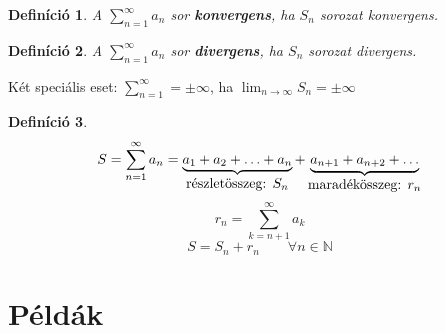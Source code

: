 \documentclass[a4paper,12pt,twoside]{book}
\newtheorem{defi}{Definíció}[chapter]
\theoremstyle{break}
\theoremstyle{plain}
\begin{document}
\begin{defi} A $\displaystyle \sum^{\infty}_{n=1} a_n$ sor \textbf{konvergens}, ha $S_n$ sorozat konvergens. \end{defi}

\begin{defi} A $\displaystyle \sum^{\infty}_{n=1} a_n$ sor \textbf{divergens}, ha $S_n$ sorozat divergens. \end{defi}

Két speciális eset: $\displaystyle \sum^{\infty}_{n=1} = \pm\infty$, ha $\displaystyle\lim_{n\to\infty} S_n = \pm\infty$\\

\begin{defi}
 \[S=\sum^\infty_{n=1} a_n = \underbrace{a_1+a_2+\ldots+a_n}_{\hbox{részletösszeg: $S_n$}} + \underbrace{a_{n+1}+a_{n+2}+\ldots}_{\hbox{maradékösszeg: $r_n$}}\]
 \[r_n = \sum^\infty_{k=n+1} a_k\]
 \[S = S_n + r_n \qquad \forall n\in\mathbb{N}\]
\end{defi}

\section{Példák}
\end{document}
